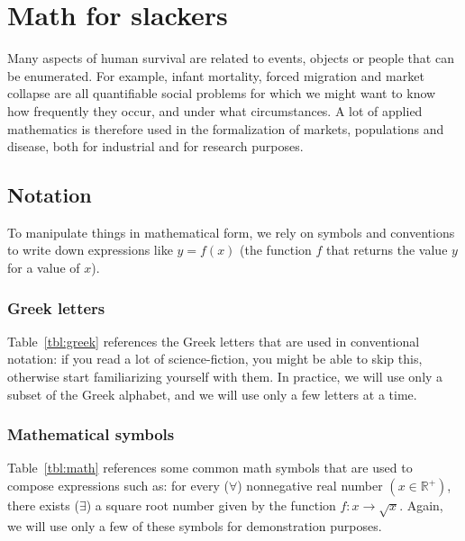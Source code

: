 \chapter{Math for slackers}
  \label{ch:Math for slackers}




Many aspects of human survival are related to events, objects or people that can be enumerated. For example, infant mortality, forced migration and market collapse are all quantifiable social problems for which we might want to know how frequently they occur, and under what circumstances. A lot of applied mathematics is therefore used in the formalization of markets, populations and disease, both for industrial and for research purposes.

\section{Notation}

To manipulate things in mathematical form, we rely on symbols and conventions to write down expressions like $y = f(x)$ (the function $f$ that returns the value $y$ for a value of $x$).

\subsection{Greek letters}%
%
Table~\ref{tbl:greek} references the Greek letters that are used in conventional notation: if you read a lot of science-fiction, you might be able to skip this, otherwise start familiarizing yourself with them. In practice, we will use only a subset of the Greek alphabet, and we will use only a few letters at a time.




\subsection{Mathematical symbols}%
%
Table~\ref{tbl:math} references some common math symbols that are used to compose expressions such as: for every ($\forall$) nonnegative real number $(x \in \mathbb{R}^{+})$, there exists ($\exists$) a square root number given by the function $f: x \rightarrow \sqrt{x}$. Again, we will use only a few of these symbols for demonstration purposes.

